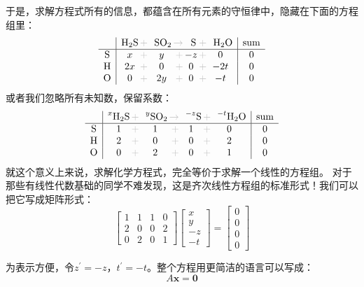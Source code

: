 \documentclass{chem-art}
\newcommand{\x}{\mathbf{x}}
\begin{document}
于是，求解方程式所有的信息，都蕴含在所有元素的守恒律中，隐藏在下面的方程组里：
\[
    \begin{array}{c|*{3}{c@{\grayplus}}c|c}
        & \multicolumn{1}{c@{\grayplus}}{\ce{H2S}} &
        \multicolumn{1}{c@{\grayto}}{\ce{SO2}} &
        \multicolumn{1}{c@{\grayplus}}{\ce{S}} &
        \multicolumn{1}{c|}{\ce{H2O}} & \text{sum} \\
        \hline
        \ce{S} & x & y & -z & 0 & 0 \\
        \ce{H} & 2x & 0 & 0 & -2t & 0 \\
        \ce{O} & 0 & 2y & 0 & -t & 0 \\
    \end{array}
\]
或者我们忽略所有未知数，保留系数：
\[
    \begin{array}{c|*{3}{c@{\grayplus}}c|c}
        & \multicolumn{1}{c@{\grayplus}}{\prescript{x}{}{\ce{H2S}}} &
        \multicolumn{1}{c@{\grayto}}{\prescript{y}{}{\ce{SO2}}} &
        \multicolumn{1}{c@{\grayplus}}{\prescript{-z}{}{\ce{S}}} &
        \multicolumn{1}{c|}{\prescript{-t}{}{\ce{H2O}}} & \text{sum} \\
        \hline
        \ce{S} & 1 & 1 & 1 & 0 & 0 \\
        \ce{H} & 2 & 0 & 0 & 2 & 0 \\
        \ce{O} & 0 & 2 & 0 & 1 & 0 \\
    \end{array}
\]
就这个意义上来说，求解化学方程式，完全等价于求解一个线性的方程组。
对于那些有线性代数基础的同学不难发现，这是齐次线性方程组的标准形式！我们可以把它写成矩阵形式：
\[
    \begin{bmatrix}
        1 & 1 & 1 & 0 \\
        2 & 0 & 0 & 2 \\
        0 & 2 & 0 & 1
    \end{bmatrix}
    \begin{bmatrix}
        x \\ y \\ -z \\ -t
    \end{bmatrix}
    =
    \begin{bmatrix}
        0 \\ 0 \\ 0 \\ 0
    \end{bmatrix}
\]

为表示方便，令\( z^\prime = -z \)，\( t^\prime = -t \)。整个方程用更简洁的语言可以写成：
\[
    A \x = \mathbf{0}
\]
\end{document}
